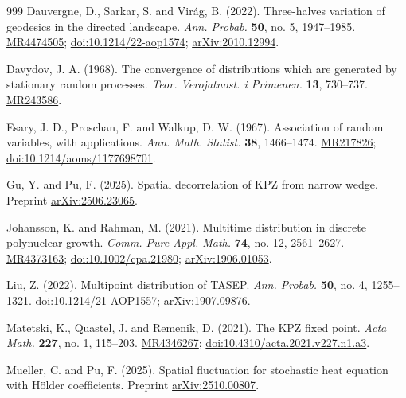 \documentclass[12pt, reqno]{amsart}
\numberwithin{equation}{section}
\theoremstyle{definition}
\begin{document}
\begin{thebibliography}{999}
Dauvergne, D., Sarkar, S. and Vir\'ag, B. (2022).
Three-halves variation of geodesics in the directed landscape.
\textit{Ann. Probab.} \textbf{50}, no. 5, 1947--1985.
\href{https://mathscinet.ams.org/mathscinet-getitem?mr=4474505}{MR4474505};
\href{https://doi.org/10.1214/22-aop1574}{doi:10.1214/22-aop1574};
\href{https://arxiv.org/abs/2010.12994}{arXiv:2010.12994}.

Davydov, J. A. (1968).
The convergence of distributions which are generated by stationary random processes.
\textit{Teor. Verojatnost. i Primenen.} \textbf{13}, 730--737.
\href{https://mathscinet.ams.org/mathscinet-getitem?mr=243586}{MR243586}.

Esary, J. D., Proschan, F. and Walkup, D. W. (1967).
Association of random variables, with applications.
\textit{Ann. Math. Statist.} \textbf{38}, 1466--1474.
\href{https://mathscinet.ams.org/mathscinet-getitem?mr=217826}{MR217826};
\href{https://doi.org/10.1214/aoms/1177698701}{doi:10.1214/aoms/1177698701}.

Gu, Y. and Pu, F. (2025).
Spatial decorrelation of KPZ from narrow wedge.
Preprint \href{https://arxiv.org/abs/2506.23065}{arXiv:2506.23065}.

Johansson, K. and Rahman, M. (2021).
Multitime distribution in discrete polynuclear growth.
\textit{Comm. Pure Appl. Math.} \textbf{74}, no. 12, 2561--2627.
\href{https://mathscinet.ams.org/mathscinet-getitem?mr=4373163}{MR4373163};
\href{https://doi.org/10.1002/cpa.21980}{doi:10.1002/cpa.21980};
\href{https://arxiv.org/abs/1906.01053}{arXiv:1906.01053}.

Liu, Z. (2022).
Multipoint distribution of TASEP.
\textit{Ann. Probab.} \textbf{50}, no. 4, 1255--1321.
\href{https://doi.org/10.1214/21-AOP1557}{doi:10.1214/21-AOP1557};
\href{https://arxiv.org/abs/1907.09876}{arXiv:1907.09876}.

Matetski, K., Quastel, J. and Remenik, D. (2021).
The KPZ fixed point.
\textit{Acta Math.} \textbf{227}, no. 1, 115--203.
\href{https://mathscinet.ams.org/mathscinet-getitem?mr=4346267}{MR4346267};
\href{https://doi.org/10.4310/acta.2021.v227.n1.a3}{doi:10.4310/acta.2021.v227.n1.a3}.

Mueller, C. and Pu, F. (2025).
Spatial fluctuation for stochastic heat equation with H\"older coefficients.
Preprint \href{https://arxiv.org/abs/2510.00807}{arXiv:2510.00807}.


\end{thebibliography}
\end{document}

